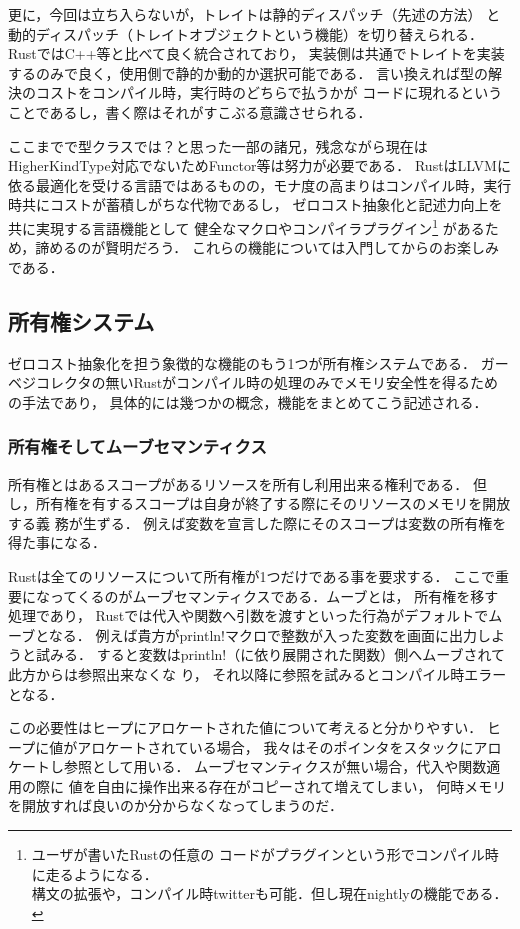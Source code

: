 更に，今回は立ち入らないが，トレイトは静的ディスパッチ（先述の方法）
と動的ディスパッチ（トレイトオブジェクトという機能）を切り替えられる．
RustではC++等と比べて良く統合されており，
実装側は共通でトレイトを実装するのみで良く，使用側で静的か動的か選択可能である．
言い換えれば型の解決のコストをコンパイル時，実行時のどちらで払うかが
コードに現れるということであるし，書く際はそれがすこぶる意識させられる．

ここまでで型クラスでは？と思った一部の諸兄，残念ながら現在はHigherKindType対応でないためFunctor等は努力が必要である．
RustはLLVMに依る最適化を受ける言語ではあるものの，モナ度の高まりはコンパイル時，実行時共にコストが蓄積しがちな代物であるし，
ゼロコスト抽象化と記述力向上を共に実現する言語機能として
健全なマクロやコンパイラプラグイン\footnote{ユーザが書いたRustの任意の
  コードがプラグインという形でコンパイル時に走るようになる． \\
  構文の拡張や，コンパイル時twitterも可能．但し現在nightlyの機能である．}
があるため，諦めるのが賢明だろう．
これらの機能については入門してからのお楽しみである．

\subsection{所有権システム}
ゼロコスト抽象化を担う象徴的な機能のもう1つが所有権システムである．
ガーベジコレクタの無いRustがコンパイル時の処理のみでメモリ安全性を得るための手法であり，
具体的には幾つかの概念，機能をまとめてこう記述される．

\subsubsection{所有権そしてムーブセマンティクス}
所有権とはあるスコープがあるリソースを所有し利用出来る権利である．
但し，所有権を有するスコープは自身が終了する際にそのリソースのメモリを開放する義
務が生ずる．
例えば変数を宣言した際にそのスコープは変数の所有権を得た事になる．

Rustは全てのリソースについて所有権が1つだけである事を要求する．
ここで重要になってくるのがムーブセマンティクスである．ムーブとは，
所有権を移す処理であり，
Rustでは代入や関数へ引数を渡すといった行為がデフォルトでムーブとなる．
例えば貴方がprintln!マクロで整数が入った変数を画面に出力しようと試みる．
すると変数はprintln!（に依り展開された関数）側へムーブされて此方からは参照出来なくな
り， それ以降に参照を試みるとコンパイル時エラーとなる．

この必要性はヒープにアロケートされた値について考えると分かりやすい．
ヒープに値がアロケートされている場合，
我々はそのポインタをスタックにアロケートし参照として用いる．
ムーブセマンティクスが無い場合，代入や関数適用の際に
値を自由に操作出来る存在がコピーされて増えてしまい，
何時メモリを開放すれば良いのか分からなくなってしまうのだ．

